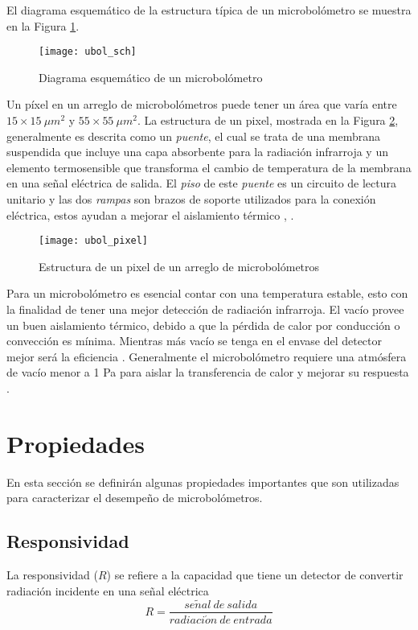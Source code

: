 El diagrama esquemático de la estructura típica de un microbolómetro se muestra en la Figura \ref{fig:ubol_sch}.
            \begin{figure}[hbtp]
                \centering
                \texttt{[image: ubol\_sch]}
                \caption{Diagrama esquemático de un microbolómetro}
                \label{fig:ubol_sch}
            \end{figure}
\newpage
Un píxel en un arreglo de microbolómetros puede tener un área que varía entre $15\times 15\ \mu m^{2}$ y $55\times 55\ \mu m^{2}$. La estructura de un pixel, mostrada en la Figura \ref{fig:ubol_pixel}, generalmente es descrita como un \textit{puente}, el cual se trata de una membrana suspendida que incluye una capa absorbente para la radiación infrarroja y un elemento termosensible que transforma el cambio de temperatura de la membrana en una señal eléctrica de salida. El \textit{piso} de este \textit{puente} es un circuito de lectura unitario y las dos \textit{rampas} son brazos de soporte utilizados para la conexión eléctrica, estos ayudan a mejorar el aislamiento térmico \cite{Vincent}, \cite{Budzier}.

            \begin{figure}[hbtp]
                \centering
                \texttt{[image: ubol\_pixel]}
                \caption{Estructura de un pixel de un arreglo de microbolómetros}
                \label{fig:ubol_pixel}
            \end{figure}

Para un microbolómetro es esencial contar con una temperatura estable, esto con la finalidad de tener una mejor detección de radiación infrarroja. El vacío provee un buen aislamiento térmico, debido a que la pérdida de calor por conducción o convección es mínima. Mientras más vacío se tenga en el envase del detector mejor será la eficiencia \cite{Lau2010}.
Generalmente el microbolómetro requiere una atmósfera de vacío menor a 1 Pa para aislar la transferencia de calor y mejorar su respuesta \cite{Liu2020}.


    \section{Propiedades}
    En esta sección se definirán algunas propiedades importantes que son utilizadas para caracterizar el desempeño de microbolómetros.
        \subsection{Responsividad}
        La responsividad ($R$) se refiere a la capacidad que tiene un detector de convertir radiación incidente en una señal eléctrica
        \begin{equation}
        R = \frac{se\tilde{n}al\ de\ salida}{radiaci\acute{o}n\ de\ entrada}
        \label{eq:Responsivity}
        \end{equation}
        
